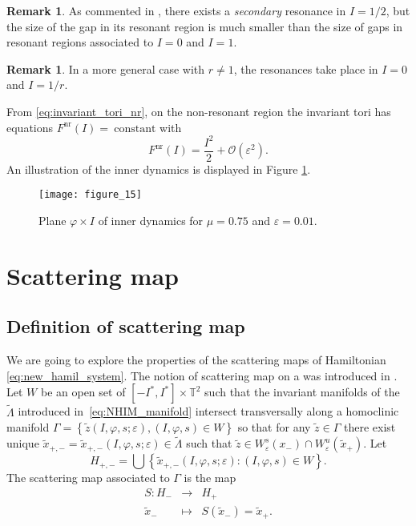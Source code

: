 \documentclass[a4paper,10pt]{article}
\newcommand{\NH}{\text{NHIM}}
\theoremstyle{definition}
\newtheorem{remark}[theorem]{Remark}
\begin{document}
\begin{remark}
As commented in \cite{Seara2006}, there exists a \emph{secondary} resonance in $I = 1/2$, but the size of the gap in its resonant region is much smaller than the size of gaps in resonant regions associated to $I = 0$ and $I= 1$.
\end{remark}

\begin{remark}In a more general case with $r\neq 1$, the resonances take place in $I = 0$ and $I = 1/r$.\label{rem:r_1}
\end{remark}
From \eqref{eq:invariant_tori_nr}, on the non-resonant region the invariant tori has equations $F^{\text{nr}}(I) =~\text{constant}$ with
\begin{equation*}
F^{\text{nr}}(I) = \frac{I^2}{2} + \mathcal{O}(\varepsilon^2).\label{eq:invariant_tori_nr_b}
\end{equation*}
An illustration of the inner dynamics is displayed in Figure \ref{fig:inner_dynamics}.

\begin{figure}[h]
\centering
\texttt{[image: figure\_15]}
\caption{Plane $\varphi \times I$ of inner dynamics for $\mu = 0.75$ and $\varepsilon = 0.01$.}\label{fig:inner_dynamics}
\end{figure}

\section{Scattering map}
\label{sec:scattering}

\subsection{Definition of scattering map }

We are going to explore the properties of the scattering maps of Hamiltonian \eqref{eq:new_hamil_system}.
The notion of scattering map on a {\NH} was introduced in \cite{Delshams2000}.
Let $W$ be an open set of $\left[-I^* , I^*\right] \times \mathbb{T}^2$ such that the invariant manifolds of the {\NH} $\tilde{\Lambda}$ introduced in~\eqref{eq:NHIM_manifold} intersect transversally along a homoclinic manifold $\Gamma = \left\{\tilde{z}(I,\varphi,s;\varepsilon) , (I,\varphi,s)\in W\right\}$ so that for any $\tilde{z}\in\Gamma$ there exist unique $\tilde{x}_{+,-} = \tilde{x}_{+,-}(I,\varphi,s;\varepsilon)\in\tilde{\Lambda}$ such that $\tilde{z}\in W_{\varepsilon}^{s}(x_-)\cap W_{\varepsilon}^{u}(\tilde{x}_+)$.
Let
$$H_{+,-} = \bigcup\left\{\tilde{x}_{+,-}(I,\varphi , s ; \varepsilon) : (I,\varphi,s)\in W\right\}.$$
The scattering map associated to $\Gamma$ is the map
\begin{eqnarray*}
S: H_- & \longrightarrow & H_+\\
\tilde{x}_- &\longmapsto & S(\tilde{x}_-) = \tilde{x}_+.
\end{eqnarray*}
\end{document}
